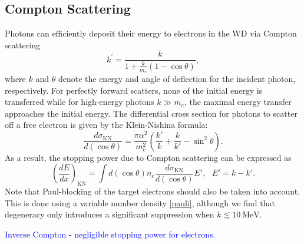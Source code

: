 \documentclass[twocolumn,showpacs,preprintnumbers,amsmath,amssymb,prd]{revtex4}
\def\r{\right)}
\def\l{\left(}
\begin{document}
\begin{appendices}
\subsection*{Compton Scattering}
Photons can efficiently deposit their energy to electrons in the WD via Compton scattering
\begin{equation}
{k^{\prime }={\frac {k}{1+{\frac {k}{m_e}}(1-\cos \theta )}}},
\end{equation}
where $k$ and $\theta$ denote the energy and angle of deflection for the incident photon, respectively. For perfectly forward scatters, none of the initial energy is transferred while for high-energy photons $k \gg m_e$, the maximal energy transfer approaches the initial energy. The differential cross section for photons to scatter off a free electron is given by the Klein-Nishina formula:
\begin{equation}
\label{KN}
\frac{d\sigma_\text{KN}}{d (\cos \theta)}=\frac{\pi \alpha^2}{m_e^2} \l \frac{k'}{k} + \frac{k}{k'} -\sin^2 \theta \r.
\end{equation}
As a result, the stopping power due to Compton scattering can be expressed as
\begin{equation}
\label{eq:comptonSP}
\l \frac{dE}{dx}\r_\text{KN} =  \int d (\cos \theta) n_e \frac{d\sigma_\text{KN}}{d (\cos \theta)} E', ~~~ E' = k - k'.
\end{equation}
Note that Paul-blocking of the target electrons should also be taken into account. This is done using a variable number density \eqref{pauli}, although we find that degeneracy only introduces a significant suppression when $k\lesssim 10 ~\text{MeV}$. 

\textcolor{blue}{Inverse Compton - negligible stopping power for electrons.}


\end{appendices}
\end{document}
